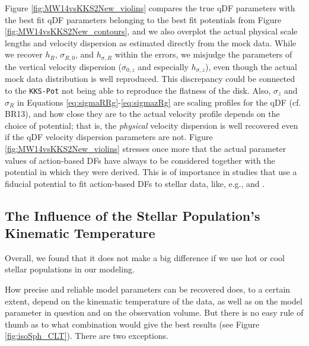 \documentclass[iop,revtex4,numberedappendix,appendixfloats]{emulateapj}
\begin{document}
Figure \ref{fig:MW14vsKKS2New_violins} compares the true qDF parameters with the best fit qDF parameters belonging to the best fit potentials from Figure \ref{fig:MW14vsKKS2New_contours}, and we also overplot the actual physical scale lengths and velocity dispersion as estimated directly from the mock data. While we recover $h_R$, $\sigma_{R,0}$, and $h_{\sigma,R}$ within the errors, we misjudge the parameters of the vertical velocity dispersion ($\sigma_{0,z}$ and especially $h_{\sigma,z}$), even though the actual mock data distribution is well reproduced. This discrepancy could be connected to the \texttt{KKS-Pot} not being able to reproduce the flatness of the disk. Also, $\sigma_z$ and $\sigma_R$ in Equations \eqref{eq:sigmaRRg}-\eqref{eq:sigmazRg} are scaling profiles for the qDF (cf. BR13), and how close they are to the actual velocity profile depends on the choice of potential; that is, the \emph{physical} velocity dispersion is well recovered even if the qDF velocity dispersion parameters are not. Figure \ref{fig:MW14vsKKS2New_violins} stresses once more that the actual parameter values of action-based DFs have always to be considered together with the potential in which they were derived. This is of importance in studies that use a fiducial potential to fit action-based DFs to stellar data, like, e.g., \citet{2015MNRAS.449.3479S} and \citet{2016MNRAS.tmp..817D}.

\subsection{The Influence of the Stellar Population's Kinematic Temperature} \label{sec:results_temperature}

Overall, we found that it does not make a big difference if we use hot or cool stellar populations in our modeling.

How precise and reliable model parameters can be recovered does, to a certain extent, depend on the kinematic temperature of the data, as well as on the model parameter in question and on the observation volume. But there is no easy rule of thumb as to what combination would give the best results (see Figure \ref{fig:isoSph_CLT}). There are two exceptions.
\end{document}
